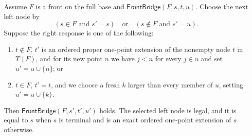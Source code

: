 \begin{lemma}
Assume $F$ is a front on the full base and
$\mathsf{FrontBridge}(F,s,t,u)$.  Choose the next left node by
\[
 (s\in F\text{ and }s'=s)\quad\text{or}\quad
 (s\notin F\text{ and }s'=u).
\]
Suppose the right response is one of the following:
\begin{enumerate}
\item $t\notin F$, $t'$ is an ordered proper one-point extension of the
      nonempty node $t$ in $T(F)$, and for its new point $n$ we have
      $j<n$ for every $j\in u$ and set $u'=u\cup\{n\}$; or
\item $t\in F$, $t'=t$, and we choose a fresh $k$ larger than every member
      of $u$, setting $u'=u\cup\{k\}$.
\end{enumerate}
Then $\mathsf{FrontBridge}(F,s',t',u')$ holds.  The selected left node is
legal, and it is equal to $s$ when $s$ is terminal and is an exact ordered
one-point extension of $s$ otherwise.
\end{lemma}
